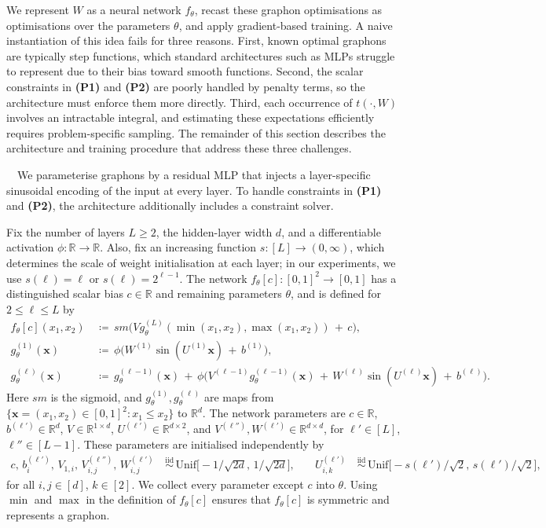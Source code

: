\documentclass{article}
\theoremstyle{plain}
\theoremstyle{definition}
\theoremstyle{remark}
\newcommand*{\R}{\mathbb{R}}
\begin{document}
We represent $W$ as a neural network $f_\theta$, recast these graphon optimisations as optimisations over the parameters $\theta$, and apply gradient-based training. A naive instantiation of this idea fails for three reasons. First, known optimal graphons are typically step functions, which standard architectures such as MLPs struggle to represent due to their bias toward smooth functions. Second, the scalar constraints in \textbf{(P1)} and \textbf{(P2)} are poorly handled by penalty terms, so the architecture must enforce them more directly. Third, each occurrence of $t(\cdot, W)$ involves an intractable integral, and estimating these expectations efficiently requires problem-specific sampling. The remainder of this section describes the architecture and training procedure that address these three challenges.

\ $\,$
We parameterise graphons by a residual MLP that injects a layer-specific sinusoidal encoding of the input at every layer. To handle constraints in \textbf{(P1)} and \textbf{(P2)}, the architecture additionally includes a constraint solver.

Fix the number of layers $L \ge 2$, the hidden-layer width $d$, and a differentiable activation $\phi : \R \to \R$. Also, fix an increasing function $s : [L] \to (0, \infty)$, which determines the scale of weight initialisation at each layer; in our experiments, we use $s(\ell) = \ell$ or $s(\ell) = 2^{\ell-1}$. The network $f_\theta[c] : [0,1]^2 \to [0,1]$ has a distinguished scalar bias $c \in \R$ and remaining parameters $\theta$, and is defined for $2 \le \ell \le L$ by
\begin{align*}
f_{\theta}[c](x_1, x_2) & \,\coloneqq\, \mathit{sm}\bigl(V g^{(L)}_\theta(\min(x_1, x_2), \max(x_1, x_2)) \,+\, c\bigr),
\\
g^{(1)}_\theta(\mathbf{x}) & \,\coloneqq\, \phi\bigl(W^{(1)} \sin(U^{(1)} \mathbf{x}) \,+\, b^{(1)}\bigr),
\\
g^{(\ell)}_\theta(\mathbf{x}) & \,\coloneqq\, g_\theta^{(\ell-1)}(\mathbf{x}) \,+\, \phi\bigl(V^{(\ell-1)} g_\theta^{(\ell-1)}(\mathbf{x}) \,+\, W^{(\ell)} \sin(U^{(\ell)} \mathbf{x}) \,+\, b^{(\ell)}\bigr).
\end{align*}
Here $\mathit{sm}$ is the sigmoid, and $g^{(1)}_\theta, g^{(\ell)}_\theta$ are maps from $\{\mathbf{x} = (x_1, x_2) \in [0,1]^2 : x_1 \le x_2\}$ to $\R^d$. The network parameters are
$c \in \R$, $b^{(\ell')} \in \R^d$, $V \in \R^{1 \times d}$, $U^{(\ell')} \in \R^{d \times 2}$, and $V^{(\ell'')}, W^{(\ell')} \in \R^{d \times d}$, for $\ell' \in [L]$, $\ell'' \in [L-1]$. These parameters are initialised independently by
\begin{align*}
c,\, b^{(\ell')}_i,\, V_{1,i},\, V^{(\ell'')}_{i,j},\, W^{(\ell')}_{i,j}
&\,\stackrel{\mathrm{iid}}{\sim}\, \mathrm{Unif}\bigl[-1/\sqrt{2d},\, 1/\sqrt{2d}\bigr],
&
\quad
U^{(\ell')}_{i,k}
&\,\stackrel{\mathrm{iid}}{\sim}\, \mathrm{Unif}\bigl[-s(\ell')/\sqrt{2},\, s(\ell')/\sqrt{2}\bigr],
\end{align*}
for all $i, j \in [d]$, $k \in [2]$. We collect every parameter except $c$ into $\theta$. Using $\min$ and $\max$ in the definition of $f_\theta[c]$ ensures that $f_\theta[c]$ is symmetric and represents a graphon.
\end{document}
